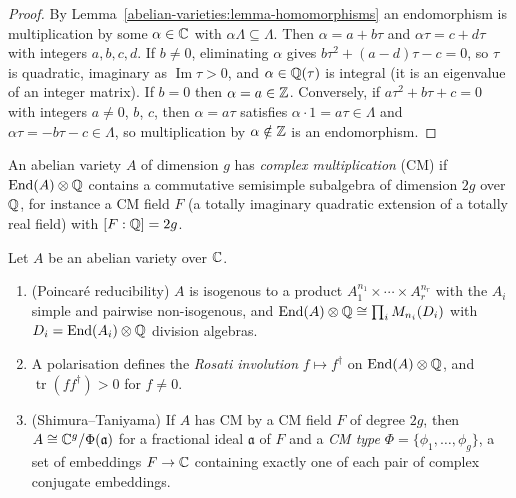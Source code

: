 \begin{proof}
By Lemma~\ref{abelian-varieties:lemma-homomorphisms} an endomorphism is multiplication by some $\alpha \in \mathbb{C}$ with $\alpha\Lambda \subseteq \Lambda$. Then $\alpha = a + b\tau$ and
$\alpha\tau = c + d\tau$ with integers $a, b, c, d$. If $b \neq 0$, eliminating $\alpha$ gives $b\tau^2 + (a - d)\tau - c = 0$, so $\tau$ is quadratic, imaginary as $\operatorname{Im}\tau > 0$,
and $\alpha \in \mathbb{Q}(\tau)$ is integral (it is an eigenvalue of an integer matrix). If $b = 0$ then $\alpha = a \in \mathbb{Z}$. Conversely, if $a\tau^2 + b\tau + c = 0$ with integers $a \neq 0$,
$b$, $c$, then $\alpha = a\tau$ satisfies $\alpha \cdot 1 = a\tau \in \Lambda$ and $\alpha\tau = -b\tau - c \in \Lambda$, so multiplication by $\alpha \notin \mathbb{Z}$ is an endomorphism.
\end{proof}

\begin{definition}\label{abelian-varieties:definition-cm}
An abelian variety $A$ of dimension $g$ has \emph{complex multiplication} (CM) if $\operatorname{End}(A) \otimes \mathbb{Q}$ contains a commutative semisimple subalgebra of dimension $2g$ over $\mathbb{Q}$,
for instance a CM field $F$ (a totally imaginary quadratic extension of a totally real field) with $[F : \mathbb{Q}] = 2g$.
\end{definition}

\begin{theorem}\label{abelian-varieties:theorem-endomorphism-algebra}
Let $A$ be an abelian variety over $\mathbb{C}$.
\begin{enumerate}
\item (Poincar\'e reducibility) $A$ is isogenous to a product $A_1^{n_1} \times \cdots \times A_r^{n_r}$ with the $A_i$ simple and pairwise non-isogenous, and
$\operatorname{End}(A) \otimes \mathbb{Q} \cong \prod_iM_{n_i}(D_i)$ with $D_i = \operatorname{End}(A_i) \otimes \mathbb{Q}$ division algebras.
\item A polarisation defines the \emph{Rosati involution} $f \mapsto f^\dagger$ on $\operatorname{End}(A) \otimes \mathbb{Q}$, and $\operatorname{tr}(ff^\dagger) > 0$ for $f \neq 0$.
\item (Shimura--Taniyama) If $A$ has CM by a CM field $F$ of degree $2g$, then $A \cong \mathbb{C}^g/\Phi(\mathfrak{a})$ for a fractional ideal $\mathfrak{a}$ of $F$ and a \emph{CM type}
$\Phi = \{\phi_1, \ldots, \phi_g\}$, a set of embeddings $F \to \mathbb{C}$ containing exactly one of each pair of complex conjugate embeddings.
\end{enumerate}
\end{theorem}

